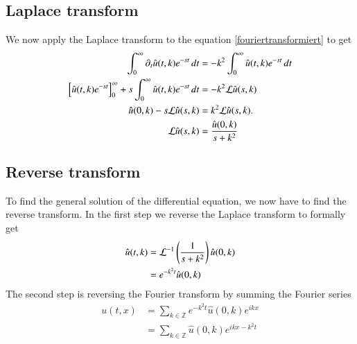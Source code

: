 \subsection{Laplace transform}
We now apply the Laplace transform to the equation
\eqref{fouriertransformiert}
to get
\begin{align*}
\int_0^{\infty} \partial_t \hat u(t,k)e^{-st}\,dt
&=
-k^2\int_0^{\infty}\hat u(t,k)e^{-st}\,dt
\\
\left[\hat u(t,k)e^{-st}\right]_0^{\infty}
+
s\int_0^{\infty}\hat u(t,k)e^{-st}\,dt
&=
-k^2{\cal L}\hat u(s,k)
\\
\hat u(0,k)-s{\cal L}\hat u(s,k)&=k^2{\cal L}\hat u(s,k).
\\
{\cal L}\hat u(s,k)&=\frac{\hat u(0,k)}{s+k^2}
\end{align*}

\subsection{Reverse transform}
To find the general solution of the differential equation, 
we now have to find the reverse transform.
In the first step we reverse the Laplace transform to
formally get
\begin{align*}
\hat u(t,k)&={\cal L}^{-1}\left(\frac1{s+k^2}\right)\hat u(0,k)
\\
&=e^{-k^2t}\hat u(0,k)
\end{align*}
The second step is reversing the Fourier transform by summing the
Fourier series
\begin{align*}
u(t,x)&=\sum_{k\in\mathbb Z}e^{-k^2t}\hat u(0,k)e^{ikx}
\\
&=\sum_{k\in\mathbb Z}\hat u(0,k)e^{ikx-k^2t}
\end{align*}

